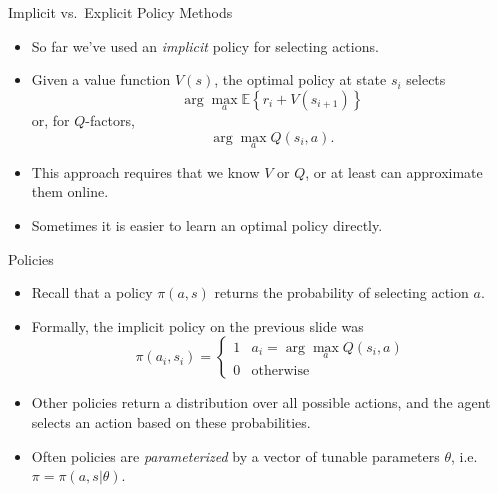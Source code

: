 \documentclass[9pt]{beamer}
\begin{document}
\begin{frame}{Implicit vs.\ Explicit Policy Methods}

\begin{itemize}
	\item So far we've used an \emph{implicit} policy for selecting actions.
	\item Given a value function $V(s)$, the optimal policy at state $s_i$ selects
	\[ \arg \max_a \mathbb{E}\left\{ r_i + V(s_{i+1}) \right\} \]
	or, for $Q$-factors,
	\[ \arg \max_a Q(s_i,a). \]
	\item<2-> This approach requires that we know $V$ or $Q$, or at least can approximate them online.
	\item<2-> Sometimes it is easier to learn an optimal policy directly.
\end{itemize}
	
\end{frame}

\begin{frame}{Policies}

\begin{itemize}
	\item Recall that a policy $\pi(a,s)$ returns the probability of selecting action $a$.
	\item Formally, the implicit policy on the previous slide was
	\[ \pi(a_i,s_i) = \begin{cases} 1 & a_i = \arg \max_a Q(s_i,a) \\ 0 & \text{otherwise} \end{cases} \]
	\item<2-> Other policies return a distribution over all possible actions, and the agent selects an action based on these probabilities.
	\item<3-> Often policies are \emph{parameterized} by a vector of tunable parameters $\theta$, i.e.\ $\pi = \pi(a,s|\theta)$.
\end{itemize}
	
\end{frame}
\end{document}
